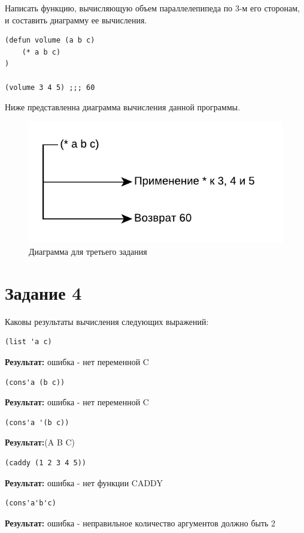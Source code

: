 Написать функцию, вычисляющую объем параллелепипеда
по 3-м его сторонам, и составить диаграмму ее вычисления.

\begin{lstlisting}
(defun volume (a b c)
    (* a b c)
)

(volume 3 4 5) ;;; 60
\end{lstlisting}

Ниже представленна диаграмма вычисления данной программы.
\begin{figure}[H]
    \centering
    \includegraphics[scale=0.85]{data/pdf/task_8.pdf}
    \caption{Диаграмма для третьего задания}
\end{figure}

\section{Задание \No{}4}

Каковы результаты вычисления следующих выражений:

\begin{lstlisting}
(list 'a c)
\end{lstlisting}
\textbf{Результат:} ошибка - нет переменной C

\begin{lstlisting}
(cons'a (b c))
\end{lstlisting}
\textbf{Результат:} ошибка - нет переменной C

\begin{lstlisting}
(cons'a '(b c))
\end{lstlisting}
\textbf{Результат:}(A B C)

\begin{lstlisting}
(caddy (1 2 3 4 5))
\end{lstlisting}
\textbf{Результат:} ошибка - нет функции CADDY

\begin{lstlisting}
(cons'a'b'c)
\end{lstlisting}
\textbf{Результат:} ошибка - неправильное количество аргументов
должно быть 2

